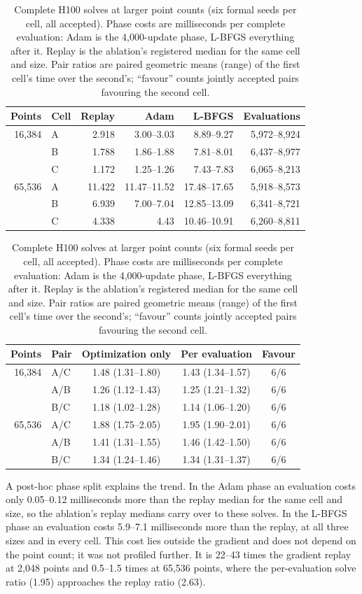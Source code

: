 \documentclass[11pt]{article}
\begin{document}
\begin{table}[t]
\centering
\caption{Complete H100 solves at larger point counts (six formal seeds per cell, all accepted). Phase costs are milliseconds per complete evaluation: Adam is the 4,000-update phase, L-BFGS everything after it. Replay is the ablation's registered median for the same cell and size. Pair ratios are paired geometric means (range) of the first cell's time over the second's; ``favour'' counts jointly accepted pairs favouring the second cell.}
\label{tab:solvescale}
\small
\begin{tabular}{rlrrrr}
\toprule
Points & Cell & Replay & Adam & L-BFGS & Evaluations\\
\midrule
16,384 & A & 2.918 & 3.00--3.03 & 8.89--9.27 & 5,972--8,924\\
 & B & 1.788 & 1.86--1.88 & 7.81--8.01 & 6,437--8,977\\
 & C & 1.172 & 1.25--1.26 & 7.43--7.83 & 6,065--8,213\\
65,536 & A & 11.422 & 11.47--11.52 & 17.48--17.65 & 5,918--8,573\\
 & B & 6.939 & 7.00--7.04 & 12.85--13.09 & 6,341--8,721\\
 & C & 4.338 & 4.43 & 10.46--10.91 & 6,260--8,811\\
\bottomrule
\end{tabular}

\medskip
\begin{tabular}{rlccc}
\toprule
Points & Pair & Optimization only & Per evaluation & Favour\\
\midrule
16,384 & A/C & 1.48 (1.31--1.80) & 1.43 (1.34--1.57) & 6/6\\
 & A/B & 1.26 (1.12--1.43) & 1.25 (1.21--1.32) & 6/6\\
 & B/C & 1.18 (1.02--1.28) & 1.14 (1.06--1.20) & 6/6\\
65,536 & A/C & 1.88 (1.75--2.05) & 1.95 (1.90--2.01) & 6/6\\
 & A/B & 1.41 (1.31--1.55) & 1.46 (1.42--1.50) & 6/6\\
 & B/C & 1.34 (1.24--1.46) & 1.34 (1.31--1.37) & 6/6\\
\bottomrule
\end{tabular}
\end{table}

A post-hoc phase split explains the trend. In the Adam phase an evaluation
costs only 0.05--0.12 milliseconds more than the replay median for the same
cell and size, so the ablation's replay medians carry over to these solves.
In the L-BFGS phase an evaluation costs 5.9--7.1 milliseconds more than the
replay, at all three sizes and in every cell. This cost lies outside the
gradient and does not depend on the point count; it was not profiled
further. It is 22--43 times the gradient replay at 2,048 points and
0.5--1.5 times at 65,536 points, where the per-evaluation solve ratio
(1.95) approaches the replay ratio (2.63).
\end{document}
